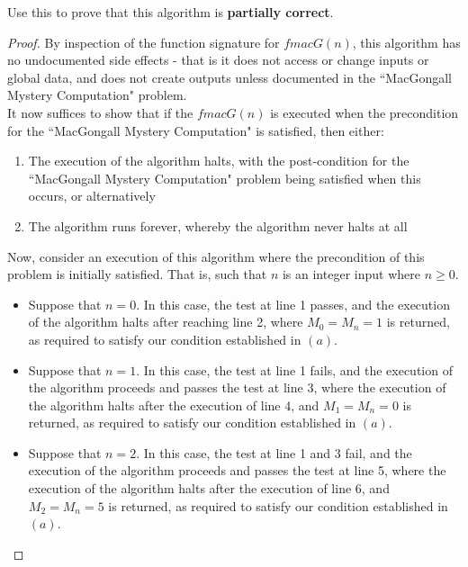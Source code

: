 \documentclass[12pt]{article}
\newenvironment{problem}[2][Problem]{\begin{trivlist}
\item[\hskip \labelsep {\bfseries #1}\hskip \labelsep {\bfseries #2.}]}{\end{trivlist}}
\begin{document}

\begin{problem}{8}
 Use this to prove that this algorithm is \textbf{partially correct}.
\end{problem}


\begin{proof}


\noindent
By inspection of the function signature for $fmacG(n)$, this algorithm has no undocumented side effects - that is it does not access or change inputs or global data, and does not create outputs unless documented in the ``MacGongall Mystery Computation" problem. \\

\noindent
It now suffices to show that if the $fmacG(n)$ is executed when the precondition for the ``MacGongall Mystery Computation" is satisfied, then either:
\begin{enumerate}[label=(\alph*)]
\item The execution of the algorithm halts, with the post-condition for the ``MacGongall Mystery Computation" problem being satisfied when this occurs, or alternatively
\item The algorithm runs forever, whereby the algorithm never halts at all
\end{enumerate}

\noindent
Now, consider an execution of this algorithm where the precondition of this problem is initially satisfied. That is, such that $n$ is an integer input where $n \geq 0$.

\begin{itemize}

\item Suppose that $n = 0$. In this case, the test at line 1 passes, and the execution of the algorithm halts after reaching line 2, where $M_0 = M_n = 1$ is returned, as required to satisfy our condition established in $(a)$.

\item Suppose that $n = 1$. In this case, the test at line 1 fails, and the execution of the algorithm proceeds and passes the test at line 3, where the execution of the algorithm halts after the execution of line 4, and $M_1 = M_n = 0$ is returned, as required to satisfy our condition established in $(a)$.

\item Suppose that $n = 2$. In this case, the test at line 1 and 3 fail, and the execution of the algorithm proceeds and passes the test at line 5, where the execution of the algorithm halts after the execution of line 6, and $M_2 = M_n = 5$ is returned, as required to satisfy our condition established in $(a)$.


\end{itemize}
\end{proof}
\end{document}
